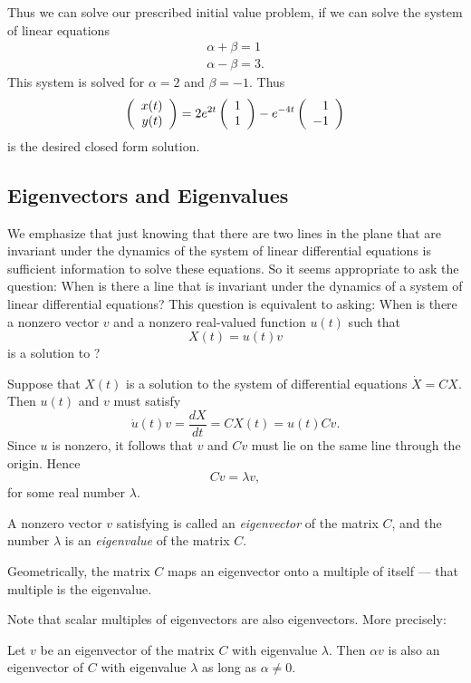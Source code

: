 \documentclass{ximera}
\begin{document}
Thus we can solve our prescribed initial value problem, if we can
solve the system of linear equations
\begin{eqnarray*}
\alpha + \beta = 1\ \\
\alpha - \beta = 3.
\end{eqnarray*}
This system is solved for $\alpha=2$ and $\beta=-1$. Thus
\[
\left(\begin{array}{r} x(t) \\ y(t)\end{array}\right) = 2e^{2t}\left(\begin{array}{r} 1 \\ 1\end{array}\right) - e^{-4t}\left(\begin{array}{r} 1 \\ -1\end{array}\right)
\]
is the desired closed form solution.

\subsection*{Eigenvectors and Eigenvalues}

We emphasize that just knowing that there are two lines in the
plane that are invariant under the dynamics of the system of
linear differential equations is sufficient information to solve
these equations.  So it seems appropriate to ask the question:
When is there a line that is invariant under the dynamics of a
system of linear differential equations?  This question is
equivalent to asking:  When is there a nonzero vector $v$ and a
nonzero real-valued function $u(t)$ such that
\[
X(t) = u(t) v
\]
is a solution to ?

Suppose that $X(t)$ is a solution to the system of differential
equations $\dot{X}=CX$.  Then $u(t)$ and $v$ must satisfy
\begin{equation}  \label{E:diffdir}
\dot{u}(t)v = \frac{dX}{dt} = CX(t) = u(t) Cv.
\end{equation}
Since $u$ is nonzero, it follows that $v$ and $Cv$ must lie on the
same line through the origin.  Hence
\begin{equation}  \label{e:eigendef}
Cv = \lambda v,
\end{equation}
for some real number $\lambda$.

\begin{Def}  \label{D:eigenvalue1}
A nonzero vector $v$ satisfying  is called an
{\em eigenvector\/}  of the matrix $C$, and
the number $\lambda$ is an {\em eigenvalue\/} 
of the matrix $C$.
\end{Def}
Geometrically, the matrix $C$ maps an eigenvector onto a multiple
of itself --- that multiple is the eigenvalue.

Note that scalar multiples of eigenvectors are also eigenvectors.  More 
precisely:
\begin{lemma}  \label{L:e'vector}
Let $v$ be an eigenvector of the matrix $C$ with eigenvalue $\lambda$.   
Then $\alpha v$ is also an eigenvector of $C$ with eigenvalue $\lambda$ 
as long as $\alpha\neq 0$.
\end{lemma}
\end{document}
